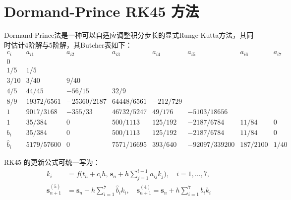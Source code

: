 \documentclass{ctexart}
\begin{document}
\section*{Dormand-Prince RK45 方法}

Dormand-Prince法是一种可以自适应调整积分步长的显式Runge-Kutta方法，其同时估计4阶解与5阶解，其Butcher表如下：
\vspace{-3pt}
\[
    \begin{array}{c|ccccccc}
        c_i       & a_{i1}     & a_{i2}      & a_{i3}     & a_{i4}   & a_{i5}        & a_{i6}   & a_{i7} \\
        \hline
        0         &            &             &            &          &               &          &        \\
        1/5       & 1/5        &             &            &          &               &          &        \\
        3/10      & 3/40       & 9/40        &            &          &               &          &        \\
        4/5       & 44/45      & -56/15      & 32/9       &          &               &          &        \\
        8/9       & 19372/6561 & -25360/2187 & 64448/6561 & -212/729 &               &          &        \\
        1         & 9017/3168  & -355/33     & 46732/5247 & 49/176   & -5103/18656   &          &        \\
        1         & 35/384     & 0           & 500/1113   & 125/192  & -2187/6784    & 11/84    & 0      \\
        \hline
        b_i       & 35/384     & 0           & 500/1113   & 125/192  & -2187/6784    & 11/84    & 0      \\
        \hat{b}_i & 5179/57600 & 0           & 7571/16695 & 393/640  & -92097/339200 & 187/2100 & 1/40
    \end{array}
\]

RK45 的更新公式可统一写为：
\[
    \begin{aligned}
        k_i                        & = f\Big(t_n + c_i h,\, \boldsymbol{s}_n + h \sum_{j=1}^{i-1} a_{ij} k_j \Big), \quad i=1,\dots,7, \\
        \boldsymbol{s}_{n+1}^{(5)} & = \boldsymbol{s}_n + h \sum_{i=1}^{7} \hat{b}_i k_i,\quad
        \boldsymbol{s}_{n+1}^{(4)} = \boldsymbol{s}_n + h \sum_{i=1}^{7} b_i k_i                                                       \\
    \end{aligned}
\]
\end{document}

